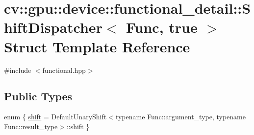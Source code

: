 \hypertarget{structcv_1_1gpu_1_1device_1_1functional__detail_1_1ShiftDispatcher_3_01Func_00_01true_01_4}{\section{cv\-:\-:gpu\-:\-:device\-:\-:functional\-\_\-detail\-:\-:Shift\-Dispatcher$<$ Func, true $>$ Struct Template Reference}
\label{structcv_1_1gpu_1_1device_1_1functional__detail_1_1ShiftDispatcher_3_01Func_00_01true_01_4}
}


{\ttfamily \#include $<$functional.\-hpp$>$}

\subsection*{Public Types}
\begin{DoxyCompactItemize}
\item 
enum \{ \hyperlink{structcv_1_1gpu_1_1device_1_1functional__detail_1_1ShiftDispatcher_3_01Func_00_01true_01_4_aad9d0faced202947ad643ad5fdfffe51a99fd4652ca1c708e70a6413f20b700e7}{shift} = Default\-Unary\-Shift$<$typename Func\-:\-:argument\-\_\-type, typename Func\-:\-:result\-\_\-type$>$\-:\-:shift
 \}
\end{DoxyCompactItemize}


